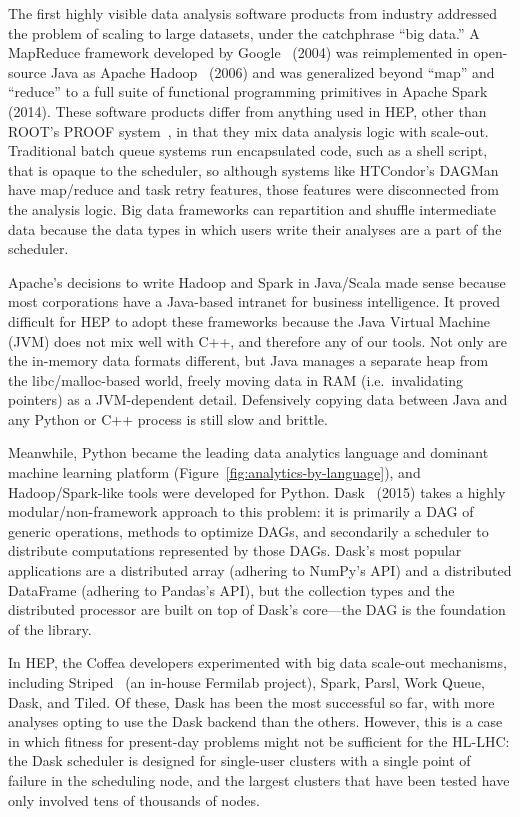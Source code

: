 \documentclass[12pt,a4paper]{article}
\begin{document}
The first highly visible data analysis software products from industry addressed the problem of scaling to large datasets, under the catchphrase ``big data.'' A MapReduce framework developed by Google~\cite{62} (2004) was reimplemented in open-source Java as Apache Hadoop~\cite{hadoop} (2006) and was generalized beyond ``map'' and ``reduce'' to a full suite of functional programming primitives in Apache Spark~\cite{zaharia2016apache} (2014). These software products differ from anything used in HEP, other than ROOT's PROOF system~\cite{Ballintijn:2006ni}, in that they mix data analysis logic with scale-out. Traditional batch queue systems run encapsulated code, such as a shell script, that is opaque to the scheduler, so although systems like HTCondor's DAGMan~\cite{htcondor} have map/reduce and task retry features, those features were disconnected from the analysis logic. Big data frameworks can repartition and shuffle intermediate data because the data types in which users write their analyses are a part of the scheduler. 

Apache's decisions to write Hadoop and Spark in Java/Scala made sense because most corporations have a Java-based intranet for business intelligence. It proved difficult for HEP to adopt these frameworks because the Java Virtual Machine (JVM) does not mix well with C++, and therefore any of our tools. Not only are the in-memory data formats different, but Java manages a separate heap from the libc/malloc-based world, freely moving data in RAM (i.e.\ invalidating pointers) as a JVM-dependent detail. Defensively copying data between Java and any Python or C++ process is still slow and brittle.

Meanwhile, Python became the leading data analytics language and dominant machine learning platform (Figure~\ref{fig:analytics-by-language}), and Hadoop/Spark-like tools were developed for Python. Dask~\cite{rocklin2015dask} (2015) takes a highly modular/non-framework approach to this problem: it is primarily a DAG of generic operations, methods to optimize DAGs, and secondarily a scheduler to distribute computations represented by those DAGs. Dask's most popular applications are a distributed array (adhering to NumPy's API) and a distributed DataFrame (adhering to Pandas's API), but the collection types and the distributed processor are built on top of Dask's core---the DAG is the foundation of the library.

In HEP, the Coffea developers experimented with big data scale-out mechanisms, including Striped~\cite{Chang:2017ske,Gutsche:2020kmd} (an in-house Fermilab project), Spark, Parsl, Work Queue, Dask, and Tiled. Of these, Dask has been the most successful so far, with more analyses opting to use the Dask backend than the others. However, this is a case in which fitness for present-day problems might not be sufficient for the HL-LHC: the Dask scheduler is designed for single-user clusters with a single point of failure in the scheduling node, and the largest clusters that have been tested have only involved tens of thousands of nodes.
\end{document}
